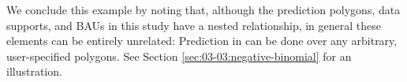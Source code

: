 \documentclass[article]{jss}
\begin{document}
 
 We conclude this example by noting that, although the prediction polygons, data supports, and BAUs in this study have a nested relationship, in general these elements can be entirely unrelated: Prediction in  can be done over any arbitrary, user-specified polygons. See Section \ref{sec:03-03:negative-binomial} for an illustration. 
 
\end{document}
